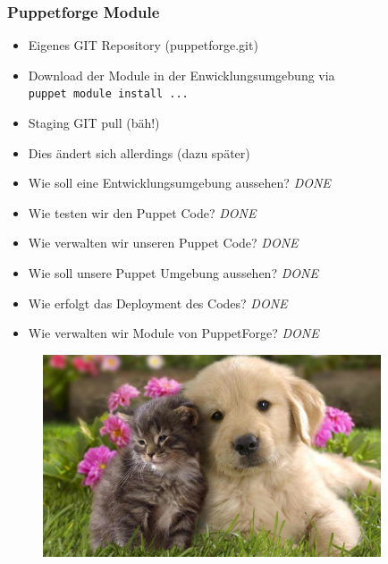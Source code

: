\documentclass{beamer}
\begin{document}
\begin{frame}
\end{frame}

\begin{frame}
  \frametitle{Puppetforge Module}

  \begin{itemize}
  \item Eigenes GIT Repository (puppetforge.git)
  \item Download der Module in der Enwicklungsumgebung via \\ \texttt{puppet module install ...}
  \item Staging GIT pull (bäh!)
  \item Dies ändert sich allerdings (dazu später)
  \end{itemize}
\end{frame}

\begin{frame}
  \begin{itemize}
  \item Wie soll eine Entwicklungsumgebung aussehen? \emph{\color{green}DONE}
  \item Wie testen wir den Puppet Code? \emph{\color{green}DONE}
  \item Wie verwalten wir unseren Puppet Code? \emph{\color{green}DONE}
  \item Wie soll unsere Puppet Umgebung aussehen?  \emph{\color{green}DONE}
  \item Wie erfolgt das Deployment des Codes? \emph{\color{green}DONE}
  \item Wie verwalten wir Module von PuppetForge? \emph{\color{green}DONE}
  \end{itemize}
\end{frame}

\begin{frame}
  \begin{figure}[ht]
    \centering
      \includegraphics[height=6cm,width=10cm]{../pics/puppy.png}
    \label{fig:stack}
  \end{figure}
\end{frame}
\end{document}
